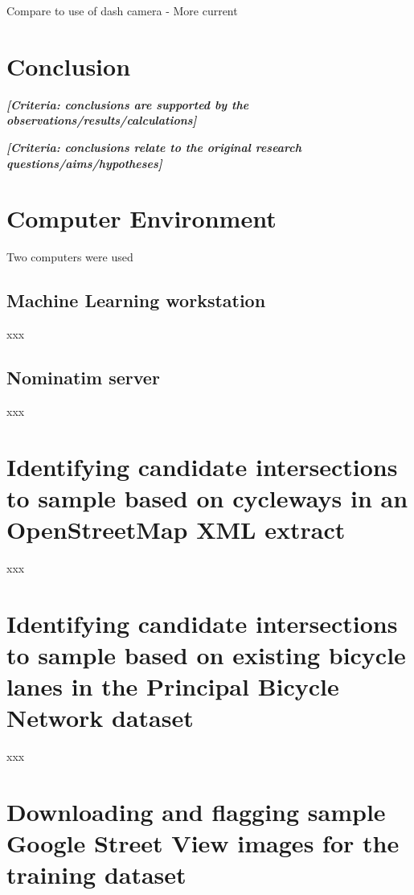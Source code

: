 \documentclass[11pt,twoside]{report}
\newcommand{\remark}[1]{{\bf \em [\marginpar{$\Leftarrow$}#1]}}
\begin{document}
Compare to use of dash camera
- More current

\chapter{Conclusion}

\remark{Criteria: conclusions are supported by the observations/results/calculations}

\remark{Criteria: conclusions relate to the original research questions/aims/hypotheses}

\appendix
\chapter{Computer Environment}
\label{a:environment}

Two computers were used

\section{Machine Learning workstation}
\label{a:computer}

xxx

\section{Nominatim server}
\label{a:nominatim}

xxx

\chapter{Identifying candidate intersections to sample based on cycleways in an OpenStreetMap XML extract}
\label{a:sample_osm}

xxx

\chapter{Identifying candidate intersections to sample based on existing bicycle lanes in the Principal Bicycle Network dataset}
\label{a:sample_pbn}

xxx

\chapter{Downloading and flagging sample Google Street View images for the training dataset}
\label{a:download_gsv}
\end{document}
